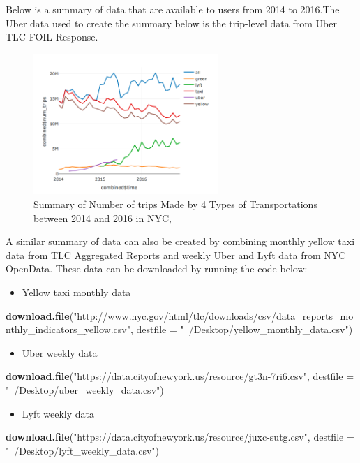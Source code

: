 \documentclass[12pt,twoside]{reedthesis}
\newenvironment{Shaded}{\begin{snugshade}}{\end{snugshade}}
\newcommand{\KeywordTok}[1]{\textcolor[rgb]{0.13,0.29,0.53}{\textbf{#1}}}
\newcommand{\DataTypeTok}[1]{\textcolor[rgb]{0.13,0.29,0.53}{#1}}
\newcommand{\StringTok}[1]{\textcolor[rgb]{0.31,0.60,0.02}{#1}}
\newcommand{\NormalTok}[1]{#1}
\providecommand{\tightlist}{%
  \setlength{\itemsep}{0pt}\setlength{\parskip}{0pt}}
\theoremstyle{definition}
\theoremstyle{definition}
\theoremstyle{definition}
\theoremstyle{remark}
\begin{document}
Below is a summary of data that are available to users from 2014 to
2016.The Uber data used to create the summary below is the trip-level
data from Uber TLC FOIL Response.
\begin{figure}

{\centering \includegraphics[width=2.76in]{figure/Num_trips_summary} 

}

\caption{Summary of Number of trips Made by 4 Types of Transportations between 2014 and 2016 in NYC, }\label{fig:num-trips-summary}
\end{figure}
A similar summary of data can also be created by combining monthly
yellow taxi data from TLC Aggregated Reports and weekly Uber and Lyft
data from NYC OpenData. These data can be downloaded by running the code
below:
\begin{itemize}
\tightlist
\item
  Yellow taxi monthly data
\end{itemize}
\begin{Shaded}
\begin{Highlighting}[]
\KeywordTok{download.file}\NormalTok{(}\StringTok{"http://www.nyc.gov/html/tlc/downloads/csv/data_reports_monthly_indicators_yellow.csv"}\NormalTok{, }
    \DataTypeTok{destfile =} \StringTok{"~/Desktop/yellow_monthly_data.csv"}\NormalTok{)}
\end{Highlighting}
\end{Shaded}
\begin{itemize}
\tightlist
\item
  Uber weekly data
\end{itemize}
\begin{Shaded}
\begin{Highlighting}[]
\KeywordTok{download.file}\NormalTok{(}\StringTok{"https://data.cityofnewyork.us/resource/gt3n-7ri6.csv"}\NormalTok{, }
    \DataTypeTok{destfile =} \StringTok{"~/Desktop/uber_weekly_data.csv"}\NormalTok{)}
\end{Highlighting}
\end{Shaded}
\begin{itemize}
\tightlist
\item
  Lyft weekly data
\end{itemize}
\begin{Shaded}
\begin{Highlighting}[]
\KeywordTok{download.file}\NormalTok{(}\StringTok{"https://data.cityofnewyork.us/resource/juxc-sutg.csv"}\NormalTok{, }
    \DataTypeTok{destfile =} \StringTok{"~/Desktop/lyft_weekly_data.csv"}\NormalTok{)}
\end{Highlighting}
\end{Shaded}
\end{document}
